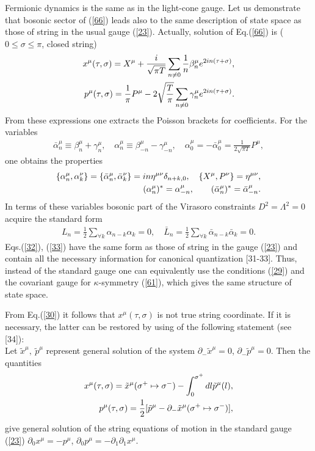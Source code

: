 \documentclass[a4paper]{article}
\begin{document}
Fermionic dynamics is the same as in the light-cone gauge.  
Let us demonstrate that bosonic sector of (\ref{66}) leads also to the same 
description of state space as those of string in the usual gauge 
(\ref{23}). Actually,
solution of Eq.(\ref{66}) is ($0\le\sigma\le\pi$, closed string)
\begin{eqnarray}\label{30}
x^\mu(\tau, \sigma)=X^\mu+\frac{i}{\sqrt{\pi T}}\sum_{n\ne 0}\frac 1n
\beta_n^\mu e^{2in(\tau+\sigma)}, \cr
p^\mu(\tau, \sigma)=
\frac{1}{\pi}P^\mu-2\sqrt{\frac{T}{\pi}}\sum_{n\ne 0}
\gamma_n^\mu e^{2in(\tau+\sigma)}.
\end{eqnarray}
From these expressions one extracts the Poisson brackets for
coefficients. For the variables
\begin{eqnarray}\label{31}
\bar\alpha_n^\mu\equiv\beta_n^\mu+\gamma_n^\mu, \quad
\alpha_n^\mu\equiv\beta_{-n}^\mu-\gamma_{-n}^\mu, \quad
\alpha_0^\mu=-\bar\alpha_0^\mu=\frac{1}{2\sqrt{\pi T}}P^\mu,
\end{eqnarray}
one obtains the properties
\begin{eqnarray}\label{32}
\{\alpha_n^\mu, \alpha_k^\nu\}=
\{\bar\alpha_n^\mu, \bar\alpha_k^\nu\}=
in\eta^{\mu\nu}\delta_{n+k,0}, \quad
\{X^\mu, P^\nu\}=\eta^{\mu\nu}, \cr
(\alpha_n^\mu)^*= \alpha_{-n}^\mu, \qquad
(\bar\alpha_n^\mu)^*=\bar \alpha_{-n}^\mu.
\end{eqnarray}
In terms of these variables bosonic part of the Virasoro 
constraints $D^2=\Lambda^2=0$ acquire the standard form
\begin{eqnarray}\label{33}
L_n=\frac 12\sum_{\forall k}\alpha_{n-k}\alpha_k=0, \quad
\bar L_n=\frac 12\sum_{\forall k}\bar\alpha_{n-k}
\bar\alpha_k=0.
\end{eqnarray}
Eqs.(\ref{32}), (\ref{33}) have the same form as those of string in the
gauge (\ref{23}) and contain all the necessary information for 
canonical quantization [31-33]. Thus, instead of the standard gauge one
can equivalently use the conditions (\ref{29}) and the covariant gauge 
for $\kappa$-symmetry (\ref{61}), which gives the same
structure of state space. 

From Eq.(\ref{30}) it follows that $x^\mu(\tau, \sigma)$ is not true
string coordinate. If it is necessary, the latter can be restored
by using of the following statement (see [34]): \\
Let $\tilde x^\mu, ~ \tilde p^\mu$ represent general solution of
the system $\partial_-\tilde x^\mu=0$,
$\partial_-\tilde p^\mu=0$.
Then the quantities
\begin{eqnarray}\label{28}
x^\mu(\tau, \sigma)=\tilde x^\mu(\sigma^+\mapsto\sigma^-)-
\int_{0}^{\sigma^+}dl\tilde p^\mu(l), \cr
p^\mu(\tau, \sigma)=\frac 12[\tilde p^\mu-\partial_-\tilde x^\mu
(\sigma^+\mapsto\sigma^-)],
\end{eqnarray}
give general solution of the string equations of motion in the standard
gauge (\ref{23}) $\partial_0x^\mu=-p^\mu$,
$\partial_0p^\mu=-\partial_1\partial_1x^\mu$.
\end{document}
